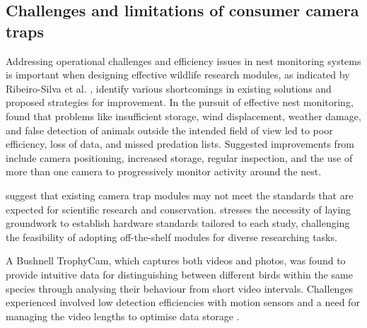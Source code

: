 \documentclass[class=report,11pt,crop=false]{standalone}
\begin{document}
\subsection{Challenges and limitations of consumer camera traps}

Addressing operational challenges and efficiency issues in nest monitoring systems is important when designing effective wildlife research modules, as indicated by Ribeiro-Silva  et al. \cite{ribeiro-silva2018testing}, identify various shortcomings in existing solutions and proposed strategies for improvement. In the pursuit of effective nest monitoring, \cite{ribeiro-silva2018testing} found that problems like insufficient storage, wind displacement, weather damage, and false detection of animals outside the intended field of view led to poor efficiency, loss of data, and missed predation lists. Suggested improvements from \cite{ribeiro-silva2018testing} include camera positioning, increased storage, regular inspection, and the use of more than one camera to progressively monitor activity around the nest. 

\cite{ahumada2020wildlife} suggest that existing camera trap modules may not meet the standards that are expected for scientific research and conservation. \cite{ahumada2020wildlife} stresses the necessity of laying groundwork to establish hardware standards tailored to each study, challenging the feasibility of adopting off-the-shelf modules for diverse researching tasks. 

A Bushnell TrophyCam, which captures both videos and photos, was found to provide intuitive data for distinguishing between different birds within the same species through analysing their behaviour from short video intervals. Challenges experienced involved low detection efficiencies with motion sensors and a need for managing the video lengths to optimise data storage \cite{ribeiro-silva2018testing}. 

\end{document}
